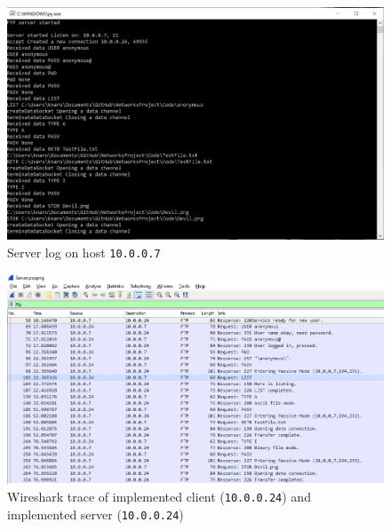 \documentclass[10pt, conference]{IEEEtran}
\def\code#1{\texttt{#1}}
\begin{document}
\begin{appendices}
\begin{figure}[h!]
\renewcommand{\thefigure}{\arabic{figure}}
\centering
\includegraphics[scale=0.6]{Server.png}
\caption{Server log on host \code{10.0.0.7}}
\label{fig: Server log}
\end{figure}

\begin{figure}[h!]
\renewcommand{\thefigure}{\arabic{figure}}
\centering
\includegraphics[scale=0.6]{ServerWireshark.png}
\caption{Wireshark trace of implemented client (\code{10.0.0.24}) and implemented server (\code{10.0.0.24})}
\label{fig: Server Wireshark}
\end{figure}


\end{appendices}
\end{document}
